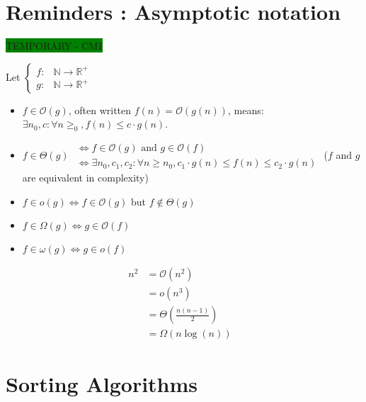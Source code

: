 \chapter{Reminders : Asymptotic notation}

\colorbox{green}{TEMPORARY - CM1}

Let 
$ \left\{
\begin{array}{ll}
f :& \mathbb{N} \rightarrow \mathbb{R}^+\\
g :& \mathbb{N} \rightarrow \mathbb{R}^+
\end{array} \right.$ 

\begin{itemize}
\renewcommand{\labelitemi}{$\bullet$}
	\item  $f \in \mathcal{O}(g)$, often written $f(n) = \mathcal{O}(g(n))$, means: $\exists n_0, c : \forall n \geq _0, f(n) \leq c \cdot g(n)$.
	\item 	
	$f \in \Theta(g)$ $\begin{array}{l} 
	   \Leftrightarrow f \in \mathcal{O}(g)  \text{ and } g \in \mathcal{O}(f) \\
	\Leftrightarrow  \exists n_0, c_1, c_2 : \forall n\geq n_0, c_1 \cdot g(n)\leq f(n) \leq c_2 \cdot g(n) 
	\end{array}$	
	($f$ and $g$ are equivalent in complexity)
\item $f \in o(g) \Leftrightarrow f \in \mathcal{O}(g)$ but $f \notin \Theta(g)$
\item  $f \in \Omega(g) \Leftrightarrow g \in \mathcal{O}(f)$
\item $f \in \omega(g) \Leftrightarrow g \in o(f)$
\end{itemize}

\vspace{0.5cm}
\begin{example}
\begin{leftbar}
\begin{align*} 
	   n^2 & = \mathcal{O}(n^2) &\\
		 & = o(n^3) &\\
		 & = \Theta \left(\frac{n (n-1)}{2}\right) &\\
		& = \Omega (n \log (n))& 
	\end{align*}
	\end{leftbar}
\end{example}


\chapter{Sorting Algorithms}

